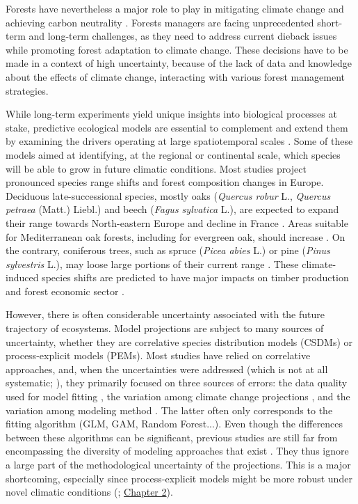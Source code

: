 \documentclass[letterpaper,8pt]{extarticle}  %
\begin{document}
\begin{doublespacing}
\begin{linenumbers}
Forests have nevertheless a major role to play in mitigating climate change and achieving carbon neutrality \citep{Korosuo2023, Hyyrynen2023}. Forests managers are facing unprecedented short-term and long-term challenges, as they need to address current dieback issues while promoting forest adaptation to climate change. These decisions have to be made in a context of high uncertainty, because of the lack of data and knowledge about the effects of climate change, interacting with various forest management strategies.

While long-term experiments yield unique insights into biological processes at stake, predictive ecological models are essential to complement and extend them by examining the drivers operating at large spatiotemporal scales \citep{Levins1993, Mitchell2006}. Some of these models aimed at identifying, at the regional or continental scale, which species will be able to grow in future climatic conditions. Most studies project pronounced species range shifts and forest composition changes in Europe. Deciduous late-successional species, mostly oaks (\emph{Quercus robur} L., \emph{Quercus petraea} (Matt.) Liebl.) and beech (\emph{Fagus sylvatica} L.), are expected to expand their range towards North-eastern Europe and decline in France \citep{Hickler2012, Hanewinkel2013, Saltre2015, Schueler2014, Dyderski2018, Takolander2019, Wessely2024}. Areas suitable for Mediterranean oak forests, including for evergreen oak, should increase \citep{Ohlemueller2006, Hanewinkel2013, Takolander2019}. On the contrary, coniferous trees, such as spruce (\emph{Picea abies} L.) or pine (\emph{Pinus sylvestris} L.), may loose large portions of their current range \citep{Hanewinkel2013, Schueler2014, Wessely2024}. These climate-induced species shifts are predicted to have major impacts on timber production and forest economic sector \citep{Hanewinkel2013, Wessely2024}. 

However, there is often considerable uncertainty associated with the future trajectory of ecosystems. Model projections are subject to many sources of uncertainty, whether they are correlative species distribution models (CSDMs) or process-explicit models (PEMs). Most studies have relied on correlative approaches, and, when the uncertainties were addressed (which is not at all systematic; \citealp{Simmonds2024}), they primarily focused on three sources of errors: the data quality used for model fitting \citep{Chen2013, BarbetMassin2010, Duputie2014, Faurby2018}, the variation among climate change projections \citep{Beaumont2007, DinizFilho2009, Thuiller2019}, and the variation among modeling method \citep{Pearson2006, DinizFilho2009, Thuiller2019}. The latter often only corresponds to the fitting algorithm (GLM, GAM, Random Forest...). Even though the differences between these algorithms can be significant, previous studies are still far from encompassing the diversity of modeling approaches that exist \citep{Dormann2012}. They thus ignore a large part of the methodological uncertainty of the projections. This is a major shortcoming, especially since process-explicit models might be more robust under novel climatic conditions (\citealp{VanderMeersch2024}; \hyperref[chapter2]{Chapter 2}).


\end{linenumbers}
\end{doublespacing}
\end{document}
